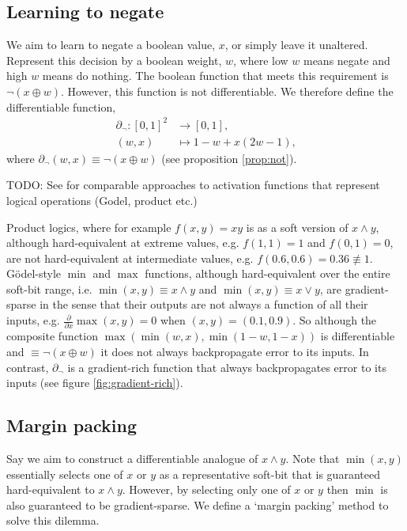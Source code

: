 \documentclass{article} %
\begin{document}
\subsection{Learning to negate}

We aim to learn to negate a boolean value, $x$, or simply leave it unaltered. Represent this decision by a boolean weight, $w$, where low $w$ means negate and high $w$ means do nothing. The boolean function that meets this requirement is $\neg(x \oplus w)$. However, this function is not differentiable. We therefore define the differentiable function,
	\begin{equation*}
	\begin{aligned}
	\partial_{\neg}: [0, 1]^{2} &\to [0,1], \\
	(w, x) &\mapsto 1 - w + x (2w - 1)\text{,}
	\end{aligned}
	\end{equation*}
where $\partial_{\neg}(w, x) \equiv \neg(x \oplus w)$ (see proposition \ref{prop:not}).

TODO: See \cite{VANKRIEKEN2022103602} for comparable approaches to activation functions that represent logical operations (Godel, product etc.)

Product logics, where for example $f(x,y) = x y$ is as a soft version of $x \wedge y$, although hard-equivalent at extreme values, e.g. $f(1,1)=1$ and $f(0,1)=0$, are not hard-equivalent at intermediate values, e.g. $f(0.6, 0.6) = 0.36 \not\equiv 1$. G\"{o}del-style $\operatorname{min}$ and $\operatorname{max}$ functions, although hard-equivalent over the entire soft-bit range, i.e. $\operatorname{min}(x,y) \equiv x \wedge y$ and $\operatorname{min}(x,y) \equiv x \vee y$, are gradient-sparse in the sense that their outputs are not always a function of all their inputs, e.g. $\frac{\partial}{\partial x} \operatorname{max}(x,y) = 0$ when $(x,y)=(0.1, 0.9)$. So although the composite function $\operatorname{max}(\operatorname{min}(w, x), \operatorname{min}(1-w, 1-x))$ is differentiable and $\equiv \neg(x \oplus w)$ it does not always backpropagate error to its inputs. In contrast, $\partial_{\neg}$ is a gradient-rich function that always backpropagates error to its inputs (see figure \ref{fig:gradient-rich}). 

\subsection{Margin packing}

Say we aim to construct a differentiable analogue of $x \wedge y$. Note that $\operatorname{min}(x,y)$ essentially selects one of $x$ or $y$ as a representative soft-bit that is guaranteed hard-equivalent to $x \wedge y$. However, by selecting only one of $x$ or $y$ then $\operatorname{min}$ is also guaranteed to be gradient-sparse. We define a `margin packing' method to solve this dilemma.
\end{document}
